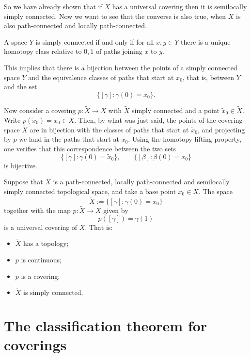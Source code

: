So we have already shown that if $X$ has a
universal covering then it is semilocally
simply connected. Now we want to see that
the converse is also true, when $X$ is also
path-connected and locally path-connected.

\begin{proposition}
\label{proposition-simply-connected-paths}
A space $Y$ is simply connected if and only
if for all $x,y\in Y$ there is a unique
homotopy class relative to $0,1$ of paths
joining $x$ to $y$.
\end{proposition}

This implies that there is a bijection
between the points of a simply connected
space $Y$ and the equivalence classes of
paths that start at $x_0$, that is, between
$Y$ and the set
$$
\{[\gamma]:\gamma(0)=x_0\}.
$$

Now consider a covering $p:\tilde{X}\to X$
with $\tilde{X}$ simply connected and a
point $\tilde{x}_0\in\tilde{X}$. Write
$p(\tilde{x}_0)=x_0\in X$. Then, by what was
just said, the points of the covering space
$\tilde{X}$ are in bijection with the
classes of paths that start at
$\tilde{x}_0$, and projecting by $p$ we land
in the paths that start at $x_0$. Using the
homotopy lifting property, one verifies that
this correspondence between the two sets
$$
\{[\gamma]:\gamma(0)=\tilde{x}_0\},
\qquad
\{[\beta]:\beta(0)=x_0\}
$$
is bijective.

\begin{theorem}
\label{theorem-universal-covering-exists}
Suppose that $X$ is a path-connected,
locally path-connected and semilocally
simply connected topological space, and take
a base point $x_0\in X$. The space
$$
\tilde{X}:=\{[\gamma]:\gamma(0)=x_0\}
$$
together with the map $p:\tilde{X}\to X$
given by
$$
p([\gamma])=\gamma(1)
$$
is a universal covering of $X$. That is:
\begin{itemize}
\item $\tilde{X}$ has a topology;
\item $p$ is continuous;
\item $p$ is a covering;
\item $\tilde{X}$ is simply connected.
\end{itemize}
\end{theorem}

\section{The classification theorem for
coverings}
\label{section-classification-coverings}


